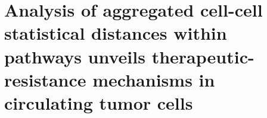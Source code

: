 \chapter{Analysis of aggregated cell-cell statistical distances within pathways unveils therapeutic-resistance mechanisms in circulating tumor cells}\label{App:E}

